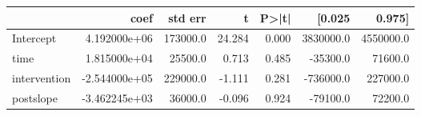 \begin{tabular}{lrrrrrr}
\hline
{} &          coef &   std err &       t &  P>|t| &     [0.025 &     0.975] \\
\hline
Intercept    &  4.192000e+06 &  173000.0 &  24.284 &  0.000 &  3830000.0 &  4550000.0 \\
time         &  1.815000e+04 &   25500.0 &   0.713 &  0.485 &   -35300.0 &    71600.0 \\
intervention & -2.544000e+05 &  229000.0 &  -1.111 &  0.281 &  -736000.0 &   227000.0 \\
postslope    & -3.462245e+03 &   36000.0 &  -0.096 &  0.924 &   -79100.0 &    72200.0 \\
\hline
\end{tabular}
